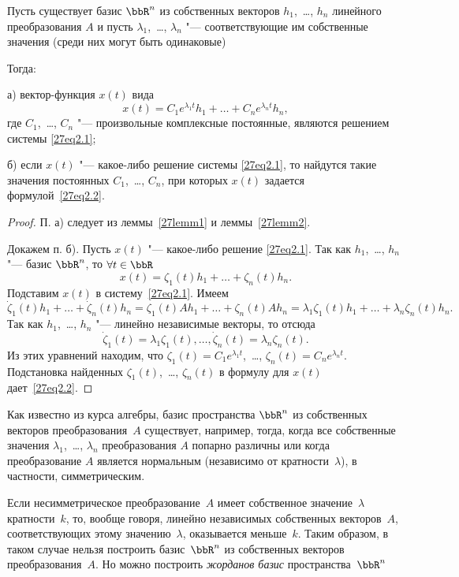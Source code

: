 \begin{thm}\label{27thm1}
Пусть существует базис $\bbR^n$ из собственных векторов $h_1$,~\dots, $h_n$ линейного преобразования $A$ и пусть $\lambda_1$,~\dots, $\lambda_n$ "--- соответствующие им собственные значения (среди них могут быть одинаковые)

Тогда:

а) вектор-функция $x(t)$ вида
\begin{equation}\label{27eq2.2}
x(t)=C_1e^{\lambda_1 t}h_1+\ldots+C_ne^{\lambda_n t}h_n,
\end{equation}
где $C_1$,~\dots, $C_n$ "--- произвольные комплексные постоянные, являются решением системы \eqref{27eq2.1};

б) если $x(t)$ "--- какое-либо решение системы \eqref{27eq2.1}, то найдутся такие значения постоянных $C_1$,~\dots, $C_n$, при которых $x(t)$ задается формулой~\eqref{27eq2.2}.
\end{thm}
\begin{proof}
П. а)  следует из леммы~\ref{27lemm1} и леммы~\ref{27lemm2}. 

Докажем п. б). Пусть $x(t)$ "--- какое-либо решение \eqref{27eq2.1}. Так как $h_1$,~\dots, $h_n$ "--- базис $\bbR^n$, то $\forall t\in \bbR$
$$
x(t)=\zeta_1(t)h_1+\ldots+\zeta_n(t)h_n.
$$
Подставим $x(t)$ в систему~\eqref{27eq2.1}. Имеем
$$
\dot{\zeta}_1(t)h_1+\ldots+\dot\zeta_n(t)h_n=\zeta_1(t)Ah_1+\ldots+\zeta_n(t)Ah_n=\lambda_1\zeta_1(t)h_1+\ldots+\lambda_n\zeta_n(t)h_n.
$$
Так как $h_1$,~\dots, $h_n$ "--- линейно независимые векторы, то отсюда
$$
\dot{\zeta}_1(t)=\lambda_1\zeta_1(t),\ldots,\dot{\zeta}_n(t)=\lambda_n\zeta_n(t).
$$
Из этих уравнений находим, что $\zeta_1(t)=C_1e^{\lambda_1t}$,~\dots, $\zeta_n(t)=C_ne^{\lambda_n t}$. Подстановка найденных $\zeta_1(t)$,~\dots, $\zeta_n(t)$ в формулу для $x(t)$ дает~\eqref{27eq2.2}.
\end{proof}

Как известно из курса алгебры, базис пространства $\bbR^n$ из собственных векторов преобразования~$A$ существует, например, тогда, когда все собственные значения $\lambda_1$,~\dots, $\lambda_n$ преобразования $A$ попарно различны или когда преобразование $A$ является нормальным (независимо от кратности~$\lambda$), в частности, симметрическим.

Если несимметрическое преобразование~$A$ имеет собственное значение~$\lambda$ кратности~$k$, то, вообще говоря, линейно независимых собственных векторов~$A$, соответствующих этому значению~$\lambda$, оказывается меньше~$k$. Таким образом, в таком случае нельзя построить базис~$\bbR^n$ из собственных векторов преобразования~$A$. Но можно построить \textit{жорданов базис} пространства~$\bbR^n$

